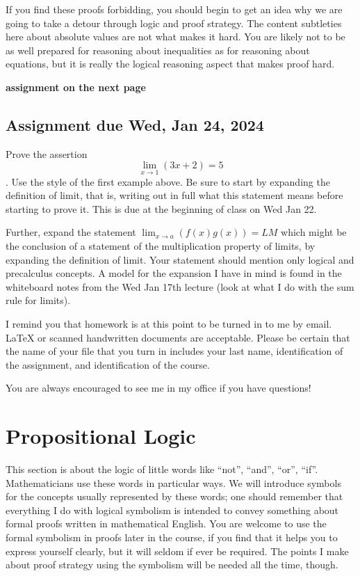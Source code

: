 \documentclass[12pt]{article}
\begin{document}
If you find these proofs forbidding, you should begin to get an idea why we are going to take a detour through logic and proof strategy.  The content subtleties here about absolute values are not what makes it hard.  You are likely not to be as well prepared for reasoning about inequalities as for reasoning about equations, but it is really the logical reasoning aspect that makes proof hard.

{\bf assignment  on the next page}

\newpage

\subsection{Assignment due  Wed, Jan 24, 2024}

Prove the assertion $$\lim_{x \rightarrow 1}(3x+2) = 5$$.   Use the style of the first example above.   Be sure to start by expanding the definition of limit, that is, writing out in full what this statement means before starting to prove it.   This is due at the beginning of class on Wed Jan 22.

Further, expand the statement $\lim_{x \rightarrow a}(f(x)g(x)) = LM$ which might be the conclusion of a statement of the multiplication property of limits, by expanding the definition of limit.  Your statement should mention only logical and precalculus concepts.  A model for the expansion I have in mind is found in the whiteboard notes from the Wed Jan 17th lecture (look at what I do with the sum rule for limits).

I remind you that homework is at this point to be turned in to me by email.  LaTeX or scanned handwritten documents are acceptable.  Please be certain that the name of your file that you turn in includes your last name, identification of the assignment, and identification of the course.



You are always encouraged to see me in my office if you have questions!

\newpage

\section{Propositional Logic}



This section is about the logic of little words like ``not'', ``and'',
``or'', ``if''.  Mathematicians use these words in particular ways.
We will introduce symbols for the concepts usually represented by
these words; one should remember that everything I do with logical
symbolism is intended to convey something about formal proofs written
in mathematical English.  You are welcome to use the formal symbolism
in proofs later in the course, if you find that it helps you to
express yourself clearly, but it will seldom if ever be required.  The
points I make about proof strategy using the symbolism will be needed
all the time, though.
\end{document}
